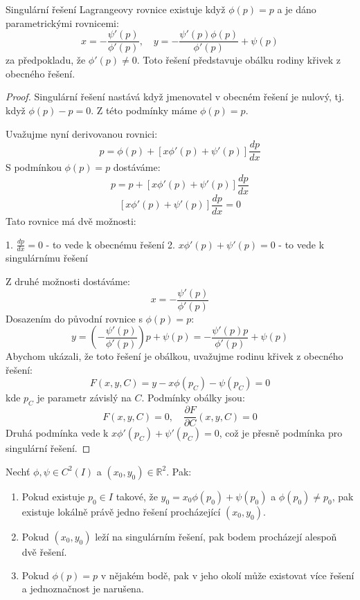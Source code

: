 \begin{theorem}
Singulární řešení Lagrangeovy rovnice existuje když $\phi(p) = p$ a je dáno parametrickými rovnicemi:
\[
x = -\frac{\psi'(p)}{\phi'(p)}, \quad y = -\frac{\psi'(p)\phi(p)}{\phi'(p)} + \psi(p)
\]
za předpokladu, že $\phi'(p) \neq 0$. Toto řešení představuje obálku rodiny křivek z obecného řešení.
\end{theorem}

\begin{proof}
Singulární řešení nastává když jmenovatel v obecném řešení je nulový, tj. když $\phi(p) - p = 0$. Z této podmínky máme $\phi(p) = p$. 

Uvažujme nyní derivovanou rovnici:
\[
p = \phi(p) + [x\phi'(p) + \psi'(p)]\frac{dp}{dx}
\]
S podmínkou $\phi(p) = p$ dostáváme:
\[
p = p + [x\phi'(p) + \psi'(p)]\frac{dp}{dx}
\]
\[
[x\phi'(p) + \psi'(p)]\frac{dp}{dx} = 0
\]
Tato rovnice má dvě možnosti: 

1. $\frac{dp}{dx} = 0$ - to vede k obecnému řešení
2. $x\phi'(p) + \psi'(p) = 0$ - to vede k singulárnímu řešení

Z druhé možnosti dostáváme:
\[
x = -\frac{\psi'(p)}{\phi'(p)}
\]
Dosazením do původní rovnice s $\phi(p) = p$:
\[
y = \left(-\frac{\psi'(p)}{\phi'(p)}\right)p + \psi(p) = -\frac{\psi'(p)p}{\phi'(p)} + \psi(p)
\]
Abychom ukázali, že toto řešení je obálkou, uvažujme rodinu křivek z obecného řešení:
\[
F(x, y, C) = y - x\phi(p_C) - \psi(p_C) = 0
\]
kde $p_C$ je parametr závislý na $C$. Podmínky obálky jsou:
\[
F(x, y, C) = 0, \quad \frac{\partial F}{\partial C}(x, y, C) = 0
\]
Druhá podmínka vede k $x\phi'(p_C) + \psi'(p_C) = 0$, což je přesně podmínka pro singulární řešení.
\end{proof}

\begin{theorem}
Nechť $\phi, \psi \in C^2(I)$ a $(x_0, y_0) \in \mathbb{R}^2$. Pak:
\begin{enumerate}
\item Pokud existuje $p_0 \in I$ takové, že $y_0 = x_0\phi(p_0) + \psi(p_0)$ a $\phi(p_0) \neq p_0$, pak existuje lokálně právě jedno řešení procházející $(x_0, y_0)$.
\item Pokud $(x_0, y_0)$ leží na singulárním řešení, pak bodem procházejí alespoň dvě řešení.
\item Pokud $\phi(p) = p$ v nějakém bodě, pak v jeho okolí může existovat více řešení a jednoznačnost je narušena.
\end{enumerate}
\end{theorem}


